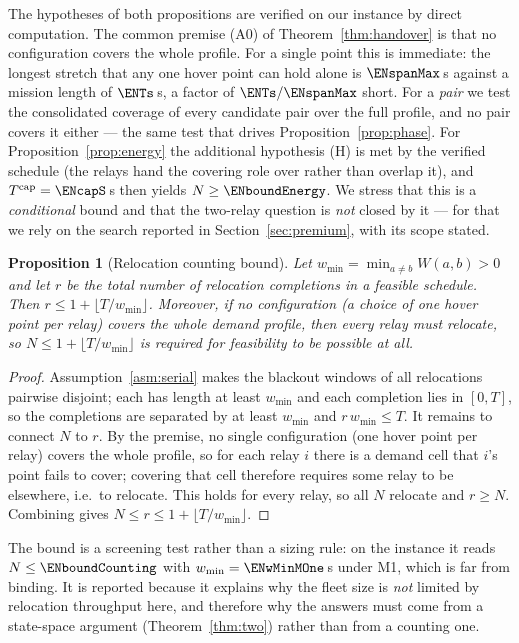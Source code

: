 \documentclass[11pt]{article}
\theoremstyle{dshplain}
\newtheorem{proposition}[theorem]{Proposition}
\theoremstyle{dshdefn}
\begin{document}
\noindent The hypotheses of both propositions are verified on our instance by
direct computation. The common premise (A0) of Theorem~\ref{thm:handover} is
that no configuration covers the whole profile. For a single point this is
immediate: the longest stretch that any one hover point can hold alone is
$\ENspanMax$\,s against a mission length of $\ENTs$\,s, a factor of
$\ENTs/\ENspanMax$ short. For a \emph{pair} we test the consolidated coverage of
every candidate pair over the full profile, and no pair covers it either --- the
same test that drives Proposition~\ref{prop:phase}. For
Proposition~\ref{prop:energy} the additional hypothesis (H) is met by the verified
schedule (the relays hand the covering role over rather than overlap it), and
$T^{\mathrm{cap}}=\ENcapS$\,s then yields $N\ge\ENboundEnergy$. We stress that this
is a \emph{conditional} bound and that the two-relay question is \emph{not} closed
by it --- for that we rely on the search reported in
Section~\ref{sec:premium}, with its scope stated.

\begin{proposition}[Relocation counting bound]
\label{prop:structural}
Let $w_{\min}=\min_{a\neq b}W(a,b)>0$ and let $r$ be the total number of
relocation completions in a feasible schedule. Then
$r\le 1+\lfloor T/w_{\min}\rfloor$. Moreover, if no \emph{configuration} (a
choice of one hover point per relay) covers the whole demand profile, then every
relay must relocate, so $N\le 1+\lfloor T/w_{\min}\rfloor$ is required for
feasibility to be possible at all.
\end{proposition}
\begin{proof}
Assumption~\ref{asm:serial} makes the blackout windows of all relocations
pairwise disjoint; each has length at least $w_{\min}$ and each completion lies in
$[0,T]$, so the completions are separated by at least $w_{\min}$ and
$r\,w_{\min}\le T$. It remains to connect $N$ to $r$. By the premise, no single
configuration (one hover point per relay) covers the whole profile, so for each
relay $i$ there is a demand cell that $i$'s point fails to cover; covering that
cell therefore requires some relay to be elsewhere, i.e.\ to relocate. This holds
for every relay, so all $N$ relocate and $r\ge N$. Combining gives
$N\le r\le 1+\lfloor T/w_{\min}\rfloor$.
\end{proof}

\noindent The bound is a screening test rather than a sizing rule: on the instance
it reads $N\le\ENboundCounting$ with $w_{\min}=\ENwMinMOne$\,s under M1, which is
far from binding. It is reported because it explains why the fleet size is
\emph{not} limited by relocation throughput here, and therefore why the answers
must come from a state-space argument (Theorem~\ref{thm:two}) rather than from a
counting one.
\end{document}
